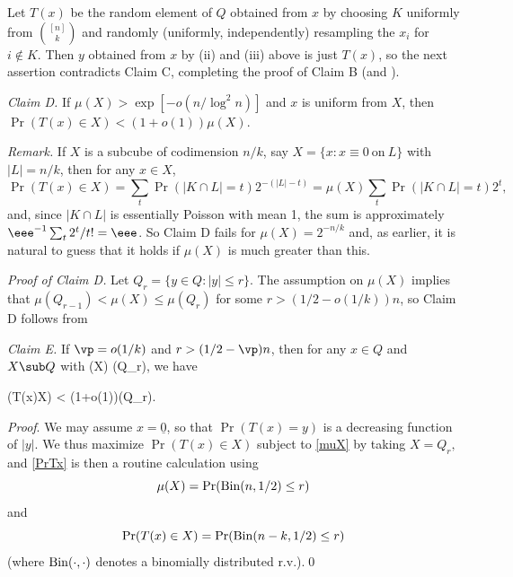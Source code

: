 Let $T(x)$ be
the random element of $Q$ %
obtained %
from $x$
by choosing $K$ uniformly from $\binom{[n]}{k}$ and
randomly (uniformly, independently) 
resampling %
the %
$x_i$  %
%
%
%
for $i\not\in K$.    %
Then $y$ %
obtained  %
from $x$ by (ii) and (iii) above is just $T(x)$,
so
the next assertion contradicts Claim C, completing the proof of
Claim B (and ).



\mn
\emph{Claim D.}
If $\mu(X) > \exp[-o(n/\log^2n)]$
and $x$ is uniform from $X$, then $\Pr(T(x)\in X) < (1+o(1))\mu(X)$.

\mn
\emph{Remark.}
If $X$ is a subcube of codimension $n/k$, say
$X=\{x:x \equiv 0 ~\mbox{on}~L\}$ with $|L |=n/k$,
then for any $x\in X$,
$$
\Pr(T(x)\in X) =\sum_t\Pr(|K\cap L |=t)2^{-(|L|-t)}
=\mu(X)\sum_t\Pr(|K\cap L |=t)2^t,
$$
and, since $|K\cap L|$ is essentially Poisson with mean 1,
the sum is
approximately
$ \eee^{-1}\sum_t2^t/t! = \eee$.
So Claim D fails for $\mu(X) = 2^{-n/k}$ and, as earlier,
it is %
natural to guess that it holds if $\mu(X)$ is much
%
greater  %
than this.

\mn
\emph{Proof of Claim D.}
Let $Q_r=\{y\in Q:|y|\leq r\}$.
The assumption on $\mu(X)$ implies that
$\mu(Q_{r-1})<\mu(X) \leq \mu(Q_r)$
for some $r >(1/2-o(1/k))n$, so Claim D follows from

\mn
\emph{Claim E.}
If $\vp =o(1/k)$ and $r > (1/2-\vp)n$, then for any $x\in Q$ and
$X\sub Q$ with
\mu(X) \leq \mu(Q_r),
\enq
we have

\Pr(T(x)\in X) < (1+o(1))\mu(Q_r).
\enq

\mn
\emph{Proof}.
We may assume $x=\underline{0}$, so that $\Pr(T(x)=y)$ is a decreasing
function of $|y|$.
We thus maximize $\Pr(T(x)\in X)$
subject to \eqref{muX} by taking
$
X=Q_r,
$
and \eqref{PrTx} is then a routine calculation
using
$$\mu(X) =\Pr({\rm Bin}(n,1/2)\leq r)$$
and
$$\Pr(T(x)\in X) =\Pr({\rm Bin}(n-k,1/2)\leq r)$$
(where ${\rm Bin}(\cdot,\cdot)$ denotes a binomially
distributed r.v.).\qed


\mn